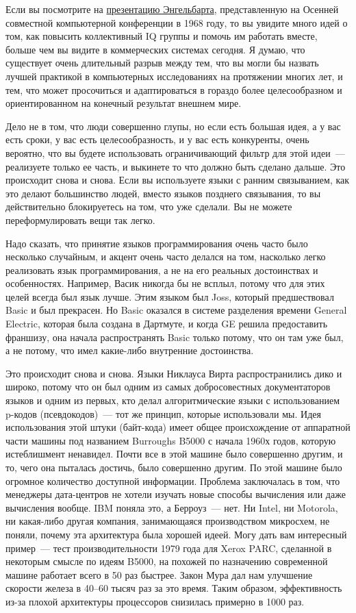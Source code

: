 Если вы посмотрите на \href{https://www.youtube.com/watch?v=yJDv-zdhzMY}{презентацию Энгельбарта}, 
представленную на Осенней совместной компьютерной конференции в 1968 году, 
то вы увидите много идей о том, как повысить коллективный IQ группы и помочь 
им работать вместе, больше чем вы видите в коммерческих системах сегодня.
Я думаю, что существует очень длительный разрыв между тем, что вы могли бы назвать 
лучшей практикой в компьютерных исследованиях на протяжении многих лет, и тем, 
что может просочиться и адаптироваться в гораздо более целесообразном 
и ориентированном на конечный результат внешнем мире.

Дело не в том, что люди совершенно глупы, но если есть большая идея, 
а у вас есть сроки, у вас есть целесообразность, и у вас есть конкуренты, 
очень вероятно, что вы будете использовать ограничивающий фильтр для этой идеи\ ---
реализуете только ее часть, и выкинете то что должно быть сделано дальше.
Это происходит снова и снова. Если вы используете языки с ранним связыванием, 
как это делают большинство людей, вместо языков позднего связывания, 
то вы действительно блокируетесь на том, что уже сделали.
Вы не можете переформулировать вещи так легко.

Надо сказать, что принятие языков программирования очень часто было несколько 
случайным, и акцент очень часто делался на том, насколько легко реализовать 
язык программирования, а не на его реальных достоинствах и особенностях.
Например, Васик никогда бы не всплыл, потому что для этих целей всегда был язык лучше.
Этим языком был Joss, который предшествовал Basic и был прекрасен.
Но Basic оказался в системе разделения времени General Electric, 
которая была создана в Дартмуте, и когда GE решила предоставить франшизу, 
она начала распространять Basic только потому, что он там уже был, 
а не потому, что имел какие-либо внутренние достоинства.

Это происходит снова и снова.
Языки Никлауса Вирта распространились дико и широко, потому что он был одним 
из самых добросовестных документаторов языков и одним из первых, кто делал 
алгоритмические языки с использованием p-кодов (псевдокодов)\ --- тот же 
принцип, которые использовали мы.
Идея использования этой штуки (байт-кода) имеет общее происхождение от аппаратной 
части машины под названием Burroughs B5000 с начала 1960х годов, которую истеблишмент ненавидел.
Почти все в этой машине было совершенно другим, и то, чего она пыталась достичь, было совершенно другим.
По этой машине было огромное количество доступной информации.
Проблема заключалась в том, что менеджеры дата-центров не хотели изучать новые способы вычисления или даже вычисления вообще.
IBM поняла это, а Берроуз\ --- нет.
Ни Intel, ни Motorola, ни какая-либо другая компания, занимающаяся 
производством микросхем, не поняли, почему эта архитектура была хорошей идеей.
Могу дать вам интересный пример\ --- тест производительности 1979 года для Xerox PARC, 
сделанной в некоторым смысле по идеям B5000, на похожей по назначению 
современной машине работает всего в 50 раз быстрее.
Закон Мура дал нам улучшение скорости железа в 40–60 тысяч раз за это время. 
Таким образом, эффективность из-за плохой архитектуры процессоров снизилась примерно в 1000 раз.

